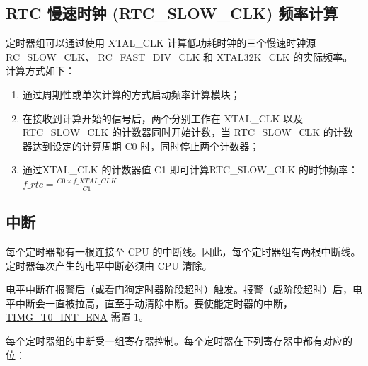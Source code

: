 \documentclass[main\_\_CN.tex]{subfiles}
\begin{document}
\subsection{RTC 慢速时钟 (RTC\_SLOW\_CLK) 频率计算}
定时器组可以通过使用 XTAL\_CLK 计算低功耗时钟的三个慢速时钟源 RC\_SLOW\_CLK、 RC\_FAST\_DIV\_CLK 和 XTAL32K\_CLK 的实际频率。计算方式如下：
\begin{enumerate}
    \item 通过周期性或单次计算的方式启动频率计算模块；
    \item 在接收到计算开始的信号后，两个分别工作在 XTAL\_CLK 以及 RTC\_SLOW\_CLK 的计数器同时开始计数，当 RTC\_SLOW\_CLK 的计数器达到设定的计算周期 C0 时，同时停止两个计数器；
    \item 通过XTAL\_CLK 的计数器值 C1 即可计算RTC\_SLOW\_CLK 的时钟频率：$f\_rtc = \frac{C0 \times f\_XTAL\_CLK}{C1}$
\end{enumerate}

\subsection{中断}\label{sec:timg-interrupt}
每个定时器都有一根连接至 CPU 的中断线。因此，每个定时器组有两根中断线。定时器每次产生的电平中断必须由 CPU 清除。

电平中断在报警后（或看门狗定时器阶段超时）触发。报警（或阶段超时）后，电平中断会一直被拉高，直至手动清除中断。要使能定时器的中断，\hyperref[fielddesc:TIMGT0INTENA]{TIMG\_T0\_INT\_ENA} 需置 1。

每个定时器组的中断受一组寄存器控制。每个定时器在下列寄存器中都有对应的位：
\end{document}
